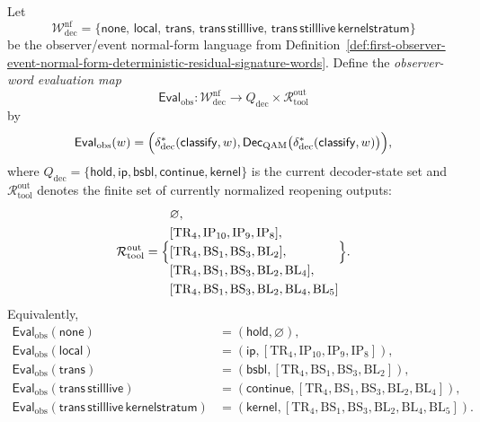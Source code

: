 \begin{definition}
\label{def:first-observer-word-evaluation-map-deterministic-decoder-outputs}
Let
\[
\mathcal W^{\mathrm{nf}}_{\mathrm{dec}}
=
\bigl\{
\mathsf{none},\,
\mathsf{local},\,
\mathsf{trans},\,
\mathsf{trans}\,\mathsf{stilllive},\,
\mathsf{trans}\,\mathsf{stilllive}\,\mathsf{kernelstratum}
\bigr\}
\]
be the observer/event normal-form language from Definition~\ref{def:first-observer-event-normal-form-deterministic-residual-signature-words}. Define the \emph{observer-word evaluation map}
\[
\mathsf{Eval}_{\mathrm{obs}}:
\mathcal W^{\mathrm{nf}}_{\mathrm{dec}}
\longrightarrow
Q_{\mathrm{dec}}\times \mathcal R_{\mathrm{tool}}^{\mathrm{out}}
\]
by
\[
\mathsf{Eval}_{\mathrm{obs}}(w)
=
\Bigl(
\delta^{\ast}_{\mathrm{dec}}(\mathsf{classify},w),
\mathsf{Dec}_{\mathrm{QAM}}\bigl(\delta^{\ast}_{\mathrm{dec}}(\mathsf{classify},w)\bigr)
\Bigr),
\]
where \(Q_{\mathrm{dec}}=\{\mathsf{hold},\mathsf{ip},\mathsf{bsbl},\mathsf{continue},\mathsf{kernel}\}\) is the current decoder-state set and \(\mathcal R_{\mathrm{tool}}^{\mathrm{out}}\) denotes the finite set of currently normalized reopening outputs:
\[
\mathcal R_{\mathrm{tool}}^{\mathrm{out}}
=
\Bigl\{
\begin{aligned}
&\varnothing,\\
&[\mathrm{TR}_4,\mathrm{IP}_{10},\mathrm{IP}_9,\mathrm{IP}_8],\\
&[\mathrm{TR}_4,\mathrm{BS}_1,\mathrm{BS}_3,\mathrm{BL}_2],\\
&[\mathrm{TR}_4,\mathrm{BS}_1,\mathrm{BS}_3,\mathrm{BL}_2,\mathrm{BL}_4],\\
&[\mathrm{TR}_4,\mathrm{BS}_1,\mathrm{BS}_3,\mathrm{BL}_2,\mathrm{BL}_4,\mathrm{BL}_5]
\end{aligned}
\Bigr\}.
\]
Equivalently,
\begin{align*}
\mathsf{Eval}_{\mathrm{obs}}(\mathsf{none})
&=(\mathsf{hold},\varnothing),\\
\mathsf{Eval}_{\mathrm{obs}}(\mathsf{local})
&=(\mathsf{ip},[\mathrm{TR}_4,\mathrm{IP}_{10},\mathrm{IP}_9,\mathrm{IP}_8]),\\
\mathsf{Eval}_{\mathrm{obs}}(\mathsf{trans})
&=(\mathsf{bsbl},[\mathrm{TR}_4,\mathrm{BS}_1,\mathrm{BS}_3,\mathrm{BL}_2]),\\
\mathsf{Eval}_{\mathrm{obs}}(\mathsf{trans}\,\mathsf{stilllive})
&=(\mathsf{continue},[\mathrm{TR}_4,\mathrm{BS}_1,\mathrm{BS}_3,\mathrm{BL}_2,\mathrm{BL}_4]),\\
\mathsf{Eval}_{\mathrm{obs}}(\mathsf{trans}\,\mathsf{stilllive}\,\mathsf{kernelstratum})
&=(\mathsf{kernel},[\mathrm{TR}_4,\mathrm{BS}_1,\mathrm{BS}_3,\mathrm{BL}_2,\mathrm{BL}_4,\mathrm{BL}_5]).
\end{align*}
\end{definition}

